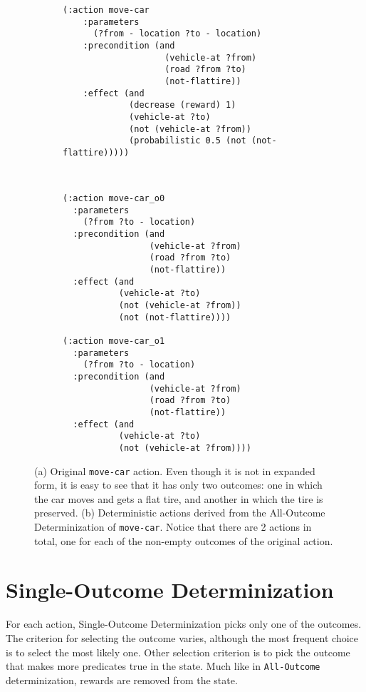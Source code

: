 \documentclass[../root.tex]{subfiles}
\begin{document}
\begin{figure}[tbhp]
\centering
\begin{subfigure}[m]{0.48\columnwidth}
\begin{lstlisting}[numbers=none]
(:action move-car
    :parameters
      (?from - location ?to - location)
    :precondition (and
                    (vehicle-at ?from)
                    (road ?from ?to)
                    (not-flattire))
    :effect (and
             (decrease (reward) 1)
             (vehicle-at ?to)
             (not (vehicle-at ?from))
             (probabilistic 0.5 (not (not-flattire)))))
\end{lstlisting}
\caption{}
\label{fig:lever-action}
\end{subfigure}
~
\begin{subfigure}[m]{0.48\columnwidth}
\begin{lstlisting}[numbers=none]
(:action move-car_o0
  :parameters
    (?from ?to - location)
  :precondition (and
                 (vehicle-at ?from)
                 (road ?from ?to)
                 (not-flattire))
  :effect (and
           (vehicle-at ?to)
           (not (vehicle-at ?from))
           (not (not-flattire))))

(:action move-car_o1
  :parameters
    (?from ?to - location)
  :precondition (and
                 (vehicle-at ?from)
                 (road ?from ?to)
                 (not-flattire))
  :effect (and
           (vehicle-at ?to)
           (not (vehicle-at ?from))))
\end{lstlisting}
\caption{}
\end{subfigure}
\caption{(a) Original \texttt{move-car} action.
	Even though it is not in expanded form,
    it is easy to see that it has only two outcomes: one in which the
	car moves and gets a flat tire, and another in which the tire is
	preserved.
	(b) Deterministic actions derived from the All-Outcome Determinization
	of \texttt{move-car}. Notice that
	there are 2 actions in total, one for each of the non-empty outcomes of
	the original action.}
\label{fig:all-outcome-move-car}
\end{figure}

\section{Single-Outcome Determinization}

For each action, Single-Outcome Determinization picks only one of the
outcomes. The criterion for selecting the outcome varies, although the most
frequent choice is to select the most likely one. Other selection criterion
is to pick the outcome that makes more predicates true in the state.
Much like in \texttt{All-Outcome} determinization, rewards are removed from the state.
\end{document}
